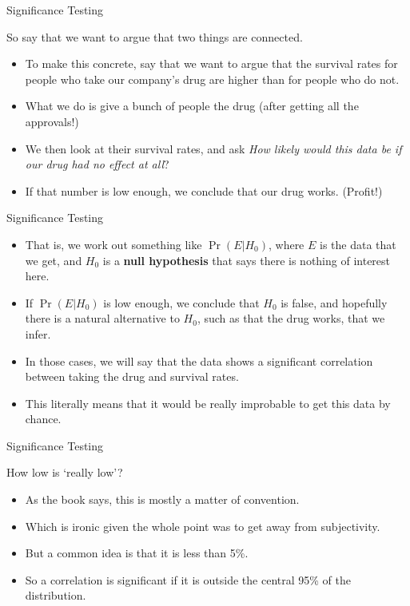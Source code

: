 \documentclass[
  ignorenonframetext,
]{beamer}
\providecommand{\tightlist}{%
  \setlength{\itemsep}{0pt}\setlength{\parskip}{0pt}}
\renewcommand{\,}{\text{, }}
\begin{document}
\begin{frame}{Significance Testing}
\protect\hypertarget{significance-testing-2}{}

So say that we want to argue that two things are connected.

\begin{itemize}
\tightlist
\item
  To make this concrete, say that we want to argue that the survival
  rates for people who take our company's drug are higher than for
  people who do not.
\item
  What we do is give a bunch of people the drug (after getting all the
  approvals!)
\item
  We then look at their survival rates, and ask \emph{How likely would
  this data be if our drug had no effect at all}?
\item
  If that number is low enough, we conclude that our drug works.
  (Profit!)
\end{itemize}

\end{frame}

\begin{frame}{Significance Testing}
\protect\hypertarget{significance-testing-3}{}

\begin{itemize}
\tightlist
\item
  That is, we work out something like \(\Pr(E | H_0)\), where \(E\) is
  the data that we get, and \(H_0\) is a \textbf{null hypothesis} that
  says there is nothing of interest here.
\item
  If \(\Pr(E | H_0)\) is low enough, we conclude that \(H_0\) is false,
  and hopefully there is a natural alternative to \(H_0\), such as that
  the drug works, that we infer.
\item
  In those cases, we will say that the data shows a significant
  correlation between taking the drug and survival rates.
\item
  This literally means that it would be really improbable to get this
  data by chance.
\end{itemize}

\end{frame}

\begin{frame}{Significance Testing}
\protect\hypertarget{significance-testing-4}{}

How low is `really low'?

\begin{itemize}
\tightlist
\item
  As the book says, this is mostly a matter of convention.
\item
  Which is ironic given the whole point was to get away from
  subjectivity.
\item
  But a common idea is that it is less than 5\%.
\item
  So a correlation is significant if it is outside the central 95\% of
  the distribution.
\end{itemize}

\end{frame}
\end{document}
